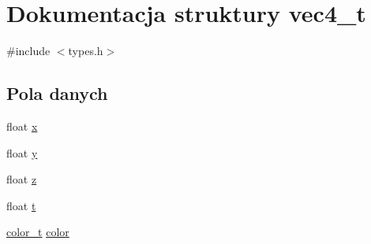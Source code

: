 \hypertarget{structvec4__t}{\section{Dokumentacja struktury vec4\-\_\-t}
\label{structvec4__t}
}


{\ttfamily \#include $<$types.\-h$>$}

\subsection*{Pola danych}
\begin{DoxyCompactItemize}
\item 
float \hyperlink{structvec4__t_ad2fbafa2239dc9fd20a91524dbf0b85e}{x}
\item 
float \hyperlink{structvec4__t_ae02fff68097997cbe7ef9baf8ae22c4e}{y}
\item 
float \hyperlink{structvec4__t_a8b304789747fe4a22eb84d464ee1dd5f}{z}
\item 
float \hyperlink{structvec4__t_a319293b88b7d43842af7a8286e9956d2}{t}
\item 
\hyperlink{types_8h_af00bd69e44901f206becdb8e7cf0ff27}{color\-\_\-t} \hyperlink{structvec4__t_a88cf183e80fa104a47beaa05e8b9304a}{color}
\end{DoxyCompactItemize}


